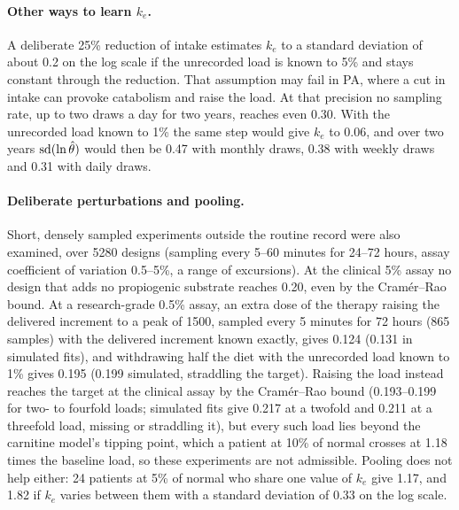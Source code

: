 \paragraph{Other ways to learn $k_e$.} A deliberate 25\% reduction of intake estimates $k_e$
to a standard deviation of about 0.2 on the log scale if the unrecorded load is known to 5\%
and stays constant through the reduction. That assumption may fail in PA, where a cut in intake
can provoke catabolism and raise the load. At that precision no sampling rate, up to two draws a
day for two years, reaches even 0.30. With the unrecorded load known to 1\% the same step would
give $k_e$ to 0.06, and over two years $\operatorname{sd}(\ln \hat\theta)$ would then be 0.47 with monthly draws,
0.38 with weekly draws and 0.31 with daily draws.

\paragraph{Deliberate perturbations and pooling.} Short, densely sampled experiments outside the
routine record were also examined, over 5280 designs (sampling every 5--60 minutes for 24--72
hours, assay coefficient of variation 0.5--5\%, a range of excursions). At the clinical 5\%
assay no design that adds no propiogenic substrate reaches 0.20, even by the Cram\'er--Rao bound.
At a research-grade 0.5\% assay, an extra dose of the therapy raising the delivered increment to
a peak of 1500\um, sampled every 5 minutes for 72 hours (865 samples) with the delivered
increment known exactly, gives 0.124 (0.131 in simulated fits), and withdrawing half the diet with
the unrecorded load known to 1\% gives 0.195 (0.199 simulated, straddling the target). Raising
the load instead reaches the target at the clinical assay by the Cram\'er--Rao bound
(0.193--0.199 for two- to fourfold loads; simulated fits give 0.217 at a twofold and 0.211 at a
threefold load, missing or straddling it), but every such load lies beyond the carnitine model's
tipping point, which a patient at 10\% of normal crosses at 1.18 times the baseline load, so
these experiments are not admissible. Pooling does not help either: 24 patients at 5\% of normal
who share one value of $k_e$ give 1.17, and 1.82 if $k_e$ varies between them with a standard
deviation of 0.33 on the log scale.

